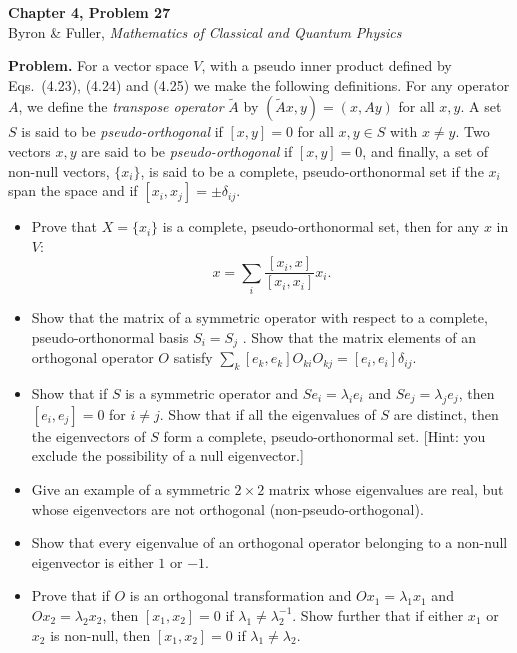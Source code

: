 \documentclass[12pt]{article}
\begin{document}
\begin{center}
{\Large\bfseries Chapter 4, Problem 27}\\[6pt]
Byron \& Fuller, \textit{Mathematics of Classical and Quantum Physics}
\end{center}

\bigskip

\textbf{Problem.} For a vector space $V$, with a pseudo inner product defined by Eqs.\ (4.23), (4.24) and (4.25) we make the following definitions. For any operator $A$, we define the \textit{transpose operator} $\tilde{A}$ by $(\tilde{A}x, y) = (x, Ay)$ for all $x, y$. A set $S$ is said to be \textit{pseudo-orthogonal} if $[x, y] = 0$ for all $x, y \in S$ with $x \neq y$. Two vectors $x, y$ are said to be \textit{pseudo-orthogonal} if $[x, y] = 0$, and finally, a set of non-null vectors, $\{x_i\}$, is said to be a complete, pseudo-orthonormal set if the $x_i$ span the space and if $[x_i, x_j] = \pm\delta_{ij}$.

\begin{itemize}
\item[(a)] Prove that $X = \{x_i\}$ is a complete, pseudo-orthonormal set, then for any $x$ in $V$:
\[
x = \sum_i \frac{[x_i, x]}{[x_i, x_i]} x_i.
\]
\item[(b)] Show that the matrix of a symmetric operator with respect to a complete, pseudo-orthonormal basis $S_i = S_j$ . Show that the matrix elements of an orthogonal operator $O$ satisfy $\sum_k [e_k, e_k] O_{ki} O_{kj} = [e_i, e_i]\delta_{ij}$.
\item[(c)] Show that if $S$ is a symmetric operator and $S e_i = \lambda_i e_i$ and $S e_j = \lambda_j e_j$, then $[e_i, e_j] = 0$ for $i \neq j$. Show that if all the eigenvalues of $S$ are distinct, then the eigenvectors of $S$ form a complete, pseudo-orthonormal set. [Hint: you exclude the possibility of a null eigenvector.]
\item[(d)] Give an example of a symmetric $2 \times 2$ matrix whose eigenvalues are real, but whose eigenvectors are not orthogonal (non-pseudo-orthogonal).
\item[(e)] Show that every eigenvalue of an orthogonal operator belonging to a non-null eigenvector is either $1$ or $-1$.
\item[(f)] Prove that if $O$ is an orthogonal transformation and $Ox_1 = \lambda_1 x_1$ and $Ox_2 = \lambda_2 x_2$, then $[x_1, x_2] = 0$ if $\lambda_1 \neq \lambda_2^{-1}$. Show further that if either $x_1$ or $x_2$ is non-null, then $[x_1, x_2] = 0$ if $\lambda_1 \neq \lambda_2$.
\end{itemize}
\end{document}
